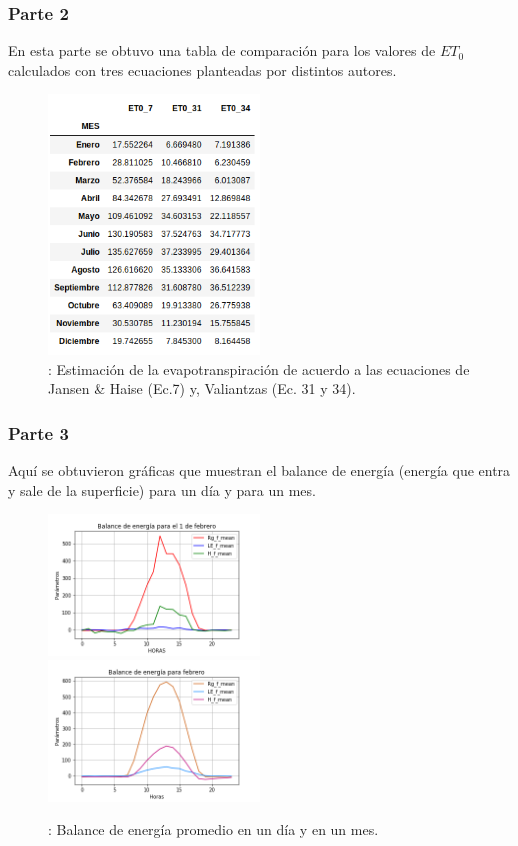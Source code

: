 \documentclass[letterpaper,12pt]{article}
\begin{document}
\subsubsection{Parte 2}
En esta parte se obtuvo una tabla de comparación para los valores de $ET_{0}$ calculados con tres ecuaciones planteadas por distintos autores.

\begin{figure}[H]
\centering
\includegraphics[width=0.5\textwidth]{eto.png}
\caption{\label{fig:graf1}: Estimación de la evapotranspiración de acuerdo a las ecuaciones de Jansen & Haise (Ec.7) y, Valiantzas (Ec. 31 y 34). }
\end{figure}

\subsubsection{Parte 3}
Aquí se obtuvieron gráficas que muestran el balance de energía (energía que entra y sale de la superficie) para un día y para un mes.

\begin{figure}[H]
\centering
\includegraphics[width=0.5\textwidth]{balance_enero.png}%
\includegraphics[width=0.5\textwidth]{balance_febrero1.png}
\caption{\label{fig:graf1}: Balance de energía promedio en un día y en un mes.}
\end{figure}
\newpage
\end{document}
